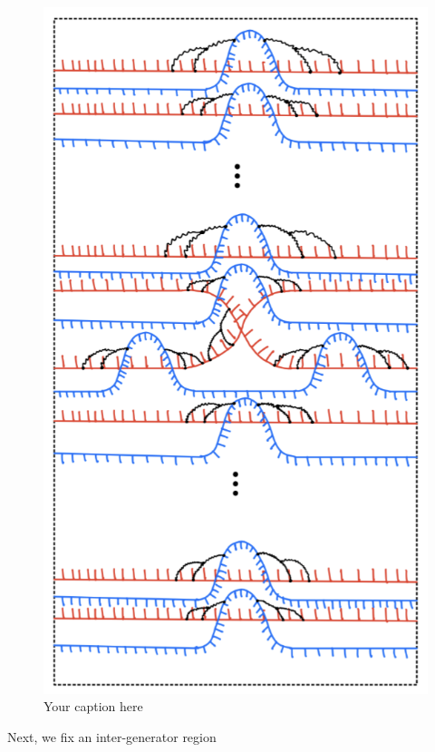 \begin{definition}
\begin{figure}[H] 
    \centering
    \includegraphics[scale = 0.95]{diagrams/local_systems_on_as_diagrams/13.png}
    \caption{Your caption here}
    \label{fig:your-label}
\end{figure}
\end{definition}
Next, we fix an inter-generator region
